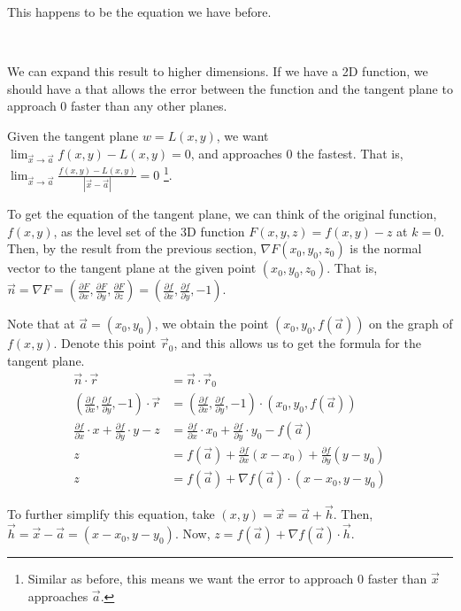 \documentclass[11pt,fleqn]{book} %
\begin{document}
This happens to be the equation we have before.

    {~~~}

We can expand this result to higher dimensions. If we have a 2D function, we should have a  that allows the error between the function and the tangent plane to approach $0$ faster than any other planes.

Given the tangent plane $w = L(x,y)$, we want $\lim_{\vec{x}\to\vec{a}} f(x,y) - L(x,y) = 0$, and approaches $0$ the fastest. That is, $\lim_{\vec{x}\to\vec{a}} \frac{f(x,y) - L(x,y)}{| \vec{x} - \vec{a} |} = 0$ \footnote{Similar as before, this means we want the error to approach $0$ faster than $\vec{x}$ approaches $\vec{a}$. }.

To get the equation of the tangent plane, we can think of the original function, $f(x,y)$, as the level set of the 3D function $F(x,y,z) = f(x,y) - z$ at $k = 0$. Then, by the result from the previous section, $\nabla F(x_0,y_0,z_0)$ is the normal vector to the tangent plane at the given point $(x_0,y_0,z_0)$. That is, $\vec{n} = \nabla F = \left( \frac{\partial F}{\partial x}, \frac{\partial F}{\partial y}, \frac{\partial F}{\partial z} \right) = \left( \frac{\partial f}{\partial x}, \frac{\partial f}{\partial y}, -1 \right)$.

Note that at $\vec{a} = (x_0, y_0)$, we obtain the point $(x_0, y_0, f(\vec{a}))$ on the graph of $f(x,y)$. Denote this point $\vec{r}_0$, and this allows us to get the formula for the tangent plane.
\begin{align*}
    \vec{n} \cdot \vec{r}
     & = \vec{n} \cdot \vec{r}_0 \\
    \left( \frac{\partial f}{\partial x}, \frac{\partial f}{\partial y}, -1 \right) \cdot \vec{r}
     & = \left( \frac{\partial f}{\partial x}, \frac{\partial f}{\partial y}, -1 \right) \cdot \left( x_0, y_0, f(\vec{a}) \right) \\
    \frac{\partial f}{\partial x} \cdot x + \frac{\partial f}{\partial y} \cdot y - z
     & = \frac{\partial f}{\partial x} \cdot x_0 + \frac{\partial f}{\partial y} \cdot y_0 - f(\vec{a}) \\
    z
     & = f(\vec{a}) + \frac{\partial f}{\partial x} (x - x_0) + \frac{\partial f}{\partial y} (y - y_0) \\
    z
     & = f(\vec{a}) + \nabla f(\vec{a}) \cdot (x-x_0, y-y_0)
\end{align*}

To further simplify this equation, take $(x,y) = \vec{x} = \vec{a} + \vec{h}$. Then, $\vec{h} = \vec{x} - \vec{a} = (x - x_0, y - y_0)$. Now, $z = f(\vec{a}) + \nabla f(\vec{a}) \cdot \vec{h}$.
\end{document}

